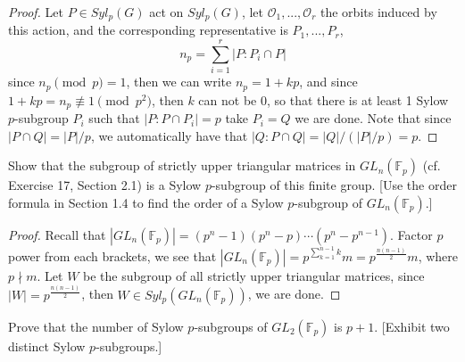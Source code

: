 \documentclass{article}
\newcommand{\F}{\mathbb{F}}
\newcommand{\orbit}{\mathcal{O}}
\newenvironment{problem}[2][Problem]{\begin{trivlist}
\item[\hskip \labelsep {\bfseries #1}\hskip \labelsep {\bfseries #2.}]}{\end{trivlist}}
\begin{document}
\begin{proof}
    Let $P\in Syl_p(G)$ act on $Syl_p(G)$, let $\orbit_1, ..., \orbit_r$ the orbits induced by this action, and the corresponding representative is $P_1, ..., P_r$, 
    \[
        n_p = \sum_{i=1}^r|P:P_i\cap P|
    \]
    since $n_p \pmod p =1$, then we can write $n_p = 1+ kp$, and since $ 1+kp=n_p \not\equiv 1 \pmod p^2$, then $k$ can not be $0$, so that there is at least 1 Sylow $p$-subgroup $P_i$ such that $|P:P\cap P_i|=p$ take $P_i=Q$ we are done. Note that since $|P\cap Q|=|P|/p$, we automatically have that $|Q:P\cap Q| = |Q|/(|P|/p) = p$.
\end{proof}
\begin{problem}{39}
        Show that the subgroup of strictly upper triangular matrices in $GL_n(\mathbb{F}_p)$ (cf. Exercise 17, Section 2.1) is a Sylow $p$-subgroup of this finite group. [Use the order formula in Section 1.4 to find the order of a Sylow $p$-subgroup of $GL_n(\mathbb{F}_p)$.]
\end{problem}
\begin{proof}
    Recall that $|GL_n(\F_p)|=(p^n-1)(p^n-p)\cdots (p^n-p^{n-1})$. Factor $p$ power from each brackets, we see that $|GL_n(\F_p)|=p^{\sum_{k=1}^{n-1}k}m = p^{\frac{n(n-1)}{2}}m$, where $p \nmid m$. Let $W$ be the subgroup of all strictly upper triangular matrices, since $|W|=p^{\frac{n(n-1)}{2}}$, then $W\in Syl_p(GL_n(\F_p))$, we are done. 
\end{proof}
\begin{problem}{40}
     Prove that the number of Sylow $p$-subgroups of $GL_2(\mathbb{F}_p)$ is $p + 1$. [Exhibit two distinct Sylow $p$-subgroups.]
\end{problem}
\end{document}
